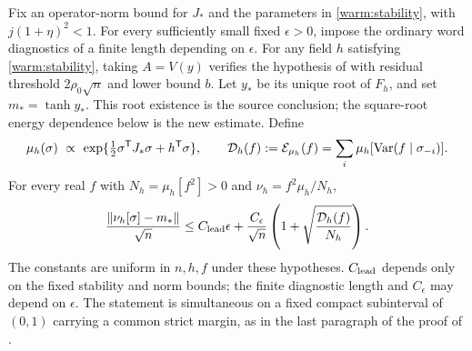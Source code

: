 \begin{lemma}
\label{warm:posterior-mean}
Fix an operator-norm bound for \(J_*\) and the parameters in
\eqref{warm:stability}, with \(j(1+\eta)^2<1\).
For every sufficiently small fixed \(\epsilon>0\), impose the
ordinary word diagnostics of a finite length depending on \(\epsilon\).
For any field \(h\) satisfying \eqref{warm:stability}, taking
\(A=V(y)\) verifies the hypothesis of \cite[Lemma~5.7]{SG} with
residual threshold \(2\rho_0\sqrt n\) and lower bound \(b\).
Let \(y_*\) be its unique root of \(F_h\), and set
\(m_*=\tanh y_*\).  This root existence is the source conclusion;
the square-root energy dependence below is the new estimate.  Define
\[
 \mu_h(\sigma)\ \propto\
   \exp\{\tfrac12\sigma^{\mathsf T}J_*\sigma+h^{\mathsf T}\sigma\},
 \qquad
 \mathcal D_h(f):=\mathcal E_{\mu_h}(f)
       =\sum_i\mu_h[\operatorname{Var}(f\mid\sigma_{-i})].
\]
For every real \(f\) with \(N_h=\mu_h[f^2]>0\) and
\(\nu_h=f^2\mu_h/N_h\),
\begin{equation}
 \frac{\|\nu_h[\sigma]-m_*\|}{\sqrt n}
 \le C_{\rm lead}\epsilon+
       \frac{C_\epsilon}{\sqrt n}
          \left(1+\sqrt{\frac{\mathcal D_h(f)}{N_h}}\right).
                                                               \label{warm:sqrt-posterior}
\end{equation}
The constants are uniform in \(n,h,f\) under these hypotheses.
\(C_{\rm lead}\) depends only on the fixed stability and norm bounds;
the finite diagnostic length and \(C_\epsilon\) may depend on
\(\epsilon\).  The statement is simultaneous on a fixed compact
subinterval of \((0,1)\) carrying a common strict margin, as in the
last paragraph of the proof of \cite[Proposition~17.1]{CM}.
\end{lemma}

